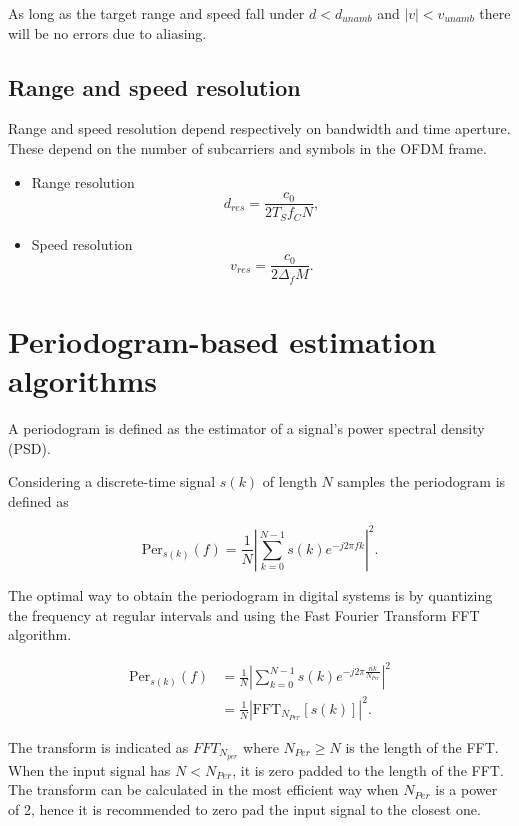         As long as the target range and speed fall under $d < d_{unamb}$ and $|v| < v_{unamb}$ there will be no errors due to aliasing.
        
    \subsection{Range and speed resolution}
    
        Range and speed resolution depend respectively on bandwidth and time aperture. These depend on the number of subcarriers and symbols in the OFDM frame.
        
        \begin{itemize}
            \item Range resolution
            $$ d_{res} = \frac{c_0}{2 T_S f_C N}, $$
            \item Speed resolution
            $$ v_{res} = \frac{c_0}{2\Delta_f M}. $$
        \end{itemize}
        

        
\section{Periodogram-based estimation algorithms}
    
    A periodogram is defined as the estimator of a signal's power spectral density (PSD).
    
    Considering a discrete-time signal $s(k)$ of length $N$ samples the periodogram is defined as
    
    \begin{equation}
        \text{Per}_{s(k)}(f) = \frac{1}{N}\left| \sum_{k=0}^{N-1} s(k)e^{-j2\pi fk}\right|^2.
    \end{equation}

    The optimal way to obtain the periodogram in digital systems is by quantizing the frequency at regular intervals and using the Fast Fourier Transform FFT algorithm.

    \begin{align}
        \text{Per}_{s(k)}(f) &= \frac{1}{N}\left| \sum_{k=0}^{N-1} s(k)e^{-j2\pi \frac{nk}{N_{Per}}}\right|^2 \\
        &= \frac{1}{N}\left| \text{FFT}_{N_{Per}}[s(k)]\right|^2.
    \end{align}
    
    
    The transform is indicated as $FFT_{N_{per}}$ where $N_{Per} \geq N$ is the length of the FFT. When the input signal has $N < N_{Per}$, it is zero padded to the length of the FFT.
    The transform can be calculated in the most efficient way when $N_{Per}$ is a power of 2, hence it is recommended to zero pad the input signal to the closest one.

